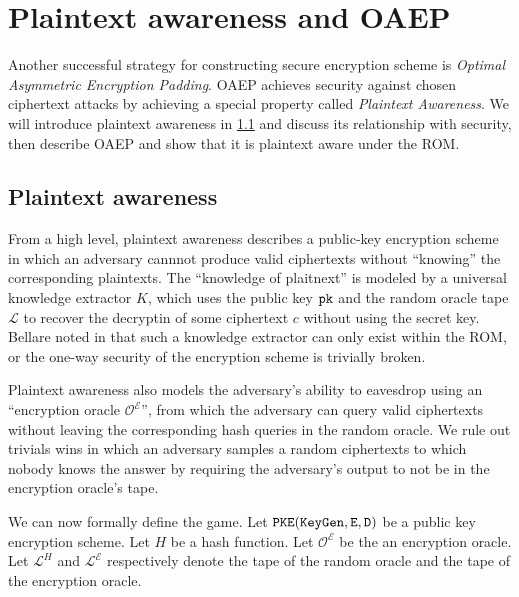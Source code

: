 \documentclass{article}
\begin{document}
\section{Plaintext awareness and OAEP}
Another successful strategy for constructing  secure encryption scheme is \emph{Optimal Asymmetric Encryption Padding}\cite{bellare1995optimal}. OAEP achieves security against chosen ciphertext attacks by achieving a special property called \emph{Plaintext Awareness}. We will introduce plaintext awareness in \ref{sec:plaintext-awareness} and discuss its relationship with  security, then describe OAEP and show that it is plaintext aware under the ROM.

\subsection{Plaintext awareness}\label{sec:plaintext-awareness}
From a high level, plaintext awareness describes a public-key encryption scheme in which an adversary cannnot produce valid ciphertexts without ``knowing'' the corresponding plaintexts. The ``knowledge of plaitnext'' is modeled by a universal knowledge extractor $K$, which uses the public key $\texttt{pk}$ and the random oracle tape $\mathcal{L}$ to recover the decryptin of some ciphertext $c$ without using the secret key. Bellare noted in \cite{bellare1998relations} that such a knowledge extractor can only exist within the ROM, or the one-way security of the encryption scheme is trivially broken.

Plaintext awareness also models the adversary's ability to eavesdrop using an ``encryption oracle $\mathcal{O}^\mathcal{E}$'', from which the adversary can query valid ciphertexts without leaving the corresponding hash queries in the random oracle. We rule out trivials wins in which an adversary samples a random ciphertexts to which nobody knows the answer by requiring the adversary's output to not be in the encryption oracle's tape.

We can now formally define the  game. Let $\texttt{PKE}(\texttt{KeyGen}, \texttt{E}, \texttt{D})$ be a public key encryption scheme. Let $H$ be a hash function. Let $\mathcal{O}^\mathcal{E}$ be the an encryption oracle. Let $\mathcal{L}^H$ and $\mathcal{L}^\mathcal{E}$ respectively denote the tape of the random oracle and the tape of the encryption oracle.
\end{document}
